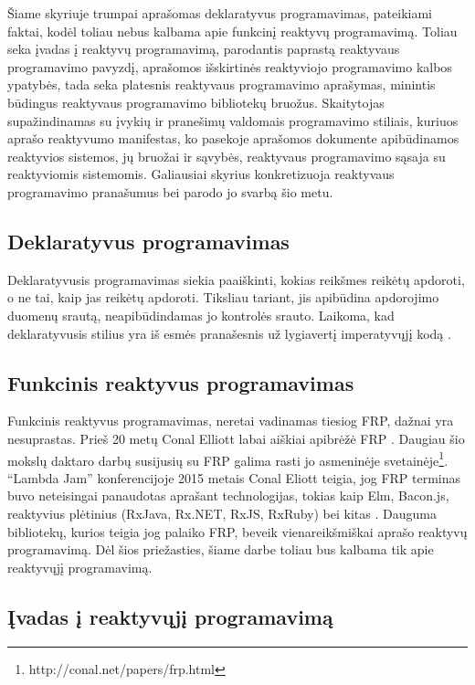 Šiame skyriuje trumpai aprašomas deklaratyvus programavimas, pateikiami faktai, kodėl toliau nebus kalbama apie funkcinį reaktyvų programavimą. Toliau seka įvadas į reaktyvų programavimą, parodantis paprastą reaktyvaus programavimo pavyzdį, aprašomos išskirtinės reaktyviojo programavimo kalbos ypatybės, tada seka platesnis reaktyvaus programavimo aprašymas, minintis būdingus reaktyvaus programavimo bibliotekų bruožus. Skaitytojas supažindinamas su įvykių ir pranešimų valdomais programavimo stiliais, kuriuos aprašo reaktyvumo manifestas, ko pasekoje aprašomos dokumente apibūdinamos reaktyvios sistemos, jų bruožai ir sąvybės, reaktyvaus programavimo sąsaja su reaktyviomis sistemomis. Galiausiai skyrius konkretizuoja reaktyvaus programavimo pranašumus bei parodo jo svarbą šio metu.

\subsection{Deklaratyvus programavimas}

Deklaratyvusis programavimas siekia paaiškinti, kokias reikšmes reikėtų apdoroti, o ne tai, kaip jas reikėtų apdoroti. Tiksliau tariant, jis apibūdina apdorojimo duomenų srautą, neapibūdindamas jo kontrolės srauto. Laikoma, kad deklaratyvusis stilius yra iš esmės pranašesnis už lygiavertį imperatyvųjį kodą \cite{DeclarativeProgramming}.

\subsection{Funkcinis reaktyvus programavimas}

Funkcinis reaktyvus programavimas, neretai vadinamas tiesiog FRP, dažnai yra nesuprastas. Prieš 20 metų Conal Elliott labai aiškiai apibrėžė FRP \cite{ElliottHudak97:Fran}. Daugiau šio mokslų daktaro darbų susijusių su FRP galima rasti jo asmeninėje svetainėje\footnote{http://conal.net/papers/frp.html}. ``Lambda Jam'' konferencijoje 2015 metais Conal Eliott teigia, jog FRP terminas buvo neteisingai panaudotas aprašant technologijas, tokias kaip Elm, Bacon.js, reaktyvius plėtinius (RxJava, Rx.NET, RxJS, RxRuby) bei kitas \cite{elliott:lambda:jam}. Dauguma bibliotekų, kurios teigia jog palaiko FRP, beveik vienareikšmiškai aprašo reaktyvų programavimą. Dėl šios priežasties, šiame darbe toliau bus kalbama tik apie reaktyvųjį programavimą.

\subsection{Įvadas į reaktyvųjį programavimą}

